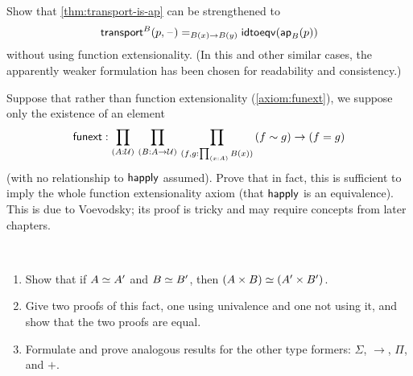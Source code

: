 \begin{ex}
  Show that \autoref{thm:transport-is-ap} can be strengthened to
  \[\mathsf{transport}^{B}(p,{\mathord{\hspace{1pt}\text{--}\hspace{1pt}}}) =_{B(x)\to B(y)} \mathsf{idtoeqv}(\mathsf{ap}_{B}(p))\]
  without using function extensionality.
  (In this and other similar cases, the apparently weaker formulation has been chosen for readability and consistency.)
\end{ex}

\begin{ex}\label{ex:strong-from-weak-funext}
  Suppose that rather than function extensionality (\autoref{axiom:funext}), we suppose only the existence of an element
  \[ \funext : \prd{A:\UU}{B:A\to \UU}{f,g:\prd{x:A} B(x)} (f\htpy g) \to (f=g) \]
  (with no relationship to $\mathsf{happly}$ assumed).
  Prove that in fact, this is sufficient to imply the whole function extensionality axiom (that $\mathsf{happly}$ is an equivalence).
  This is due to Voevodsky; its proof is tricky and may require concepts from later chapters.
\end{ex}

\begin{ex}\ 
  \begin{enumerate}
  \item Show that if $A \simeq A'$  and $B \simeq B'$, then $(A\times B) \simeq (A'\times B')$.
  \item Give two proofs of this fact, one using univalence and one not using it, and show that the two proofs are equal.
  \item Formulate and prove analogous results for the other type formers: $\Sigma$, $\to$, $\Pi$, and $+$.
\end{enumerate}
\end{ex}


